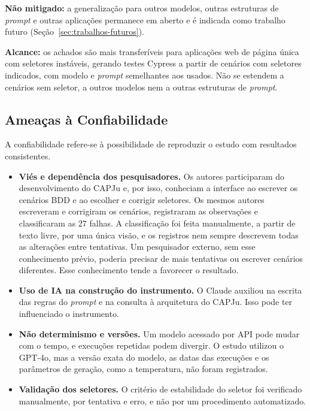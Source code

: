 \textbf{Não mitigado:} a generalização para outros modelos, outras estruturas de \textit{prompt} e outras aplicações permanece em aberto e é indicada como trabalho futuro (Seção~\ref{sec:trabalhos-futuros}).

\textbf{Alcance:} os achados são mais transferíveis para aplicações web de página única com seletores instáveis, gerando testes Cypress a partir de cenários com seletores indicados, com modelo e \textit{prompt} semelhantes aos usados. Não se estendem a cenários sem seletor, a outros modelos nem a outras estruturas de \textit{prompt}.

\subsection{Ameaças à Confiabilidade}

A confiabilidade refere-se à possibilidade de reproduzir o estudo com resultados consistentes.

\begin{itemize}
    \item \textbf{Viés e dependência dos pesquisadores.} Os autores participaram do desenvolvimento do CAPJu e, por isso, conheciam a interface ao escrever os cenários BDD e ao escolher e corrigir seletores. Os mesmos autores escreveram e corrigiram os cenários, registraram as observações e classificaram as 27 falhas. A classificação foi feita manualmente, a partir de texto livre, por uma única visão, e os registros nem sempre descrevem todas as alterações entre tentativas. Um pesquisador externo, sem esse conhecimento prévio, poderia precisar de mais tentativas ou escrever cenários diferentes. Esse conhecimento tende a favorecer o resultado.
    \item \textbf{Uso de IA na construção do instrumento.} O Claude auxiliou na escrita das regras do \textit{prompt} e na consulta à arquitetura do CAPJu. Isso pode ter influenciado o instrumento.
    \item \textbf{Não determinismo e versões.} Um modelo acessado por API pode mudar com o tempo, e execuções repetidas podem divergir. O estudo utilizou o GPT-4o, mas a versão exata do modelo, as datas das execuções e os parâmetros de geração, como a temperatura, não foram registrados.
    \item \textbf{Validação dos seletores.} O critério de estabilidade do seletor foi verificado manualmente, por tentativa e erro, e não por um procedimento automatizado.
\end{itemize}